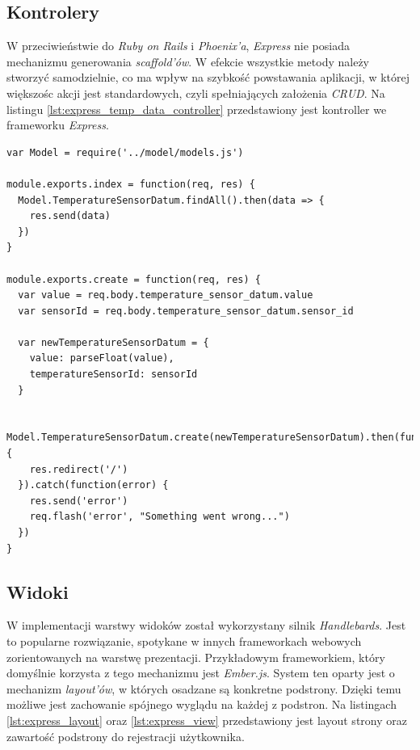 \subsection{Kontrolery}
W przeciwieństwie do \emph{Ruby on Rails} i \emph{Phoenix'a}, \emph{Express} nie posiada mechanizmu generowania \emph{scaffold'ów}. W efekcie wszystkie metody należy stworzyć samodzielnie, co ma wpływ na szybkość powstawania aplikacji, w której większośc akcji jest standardowych, czyli spełniających założenia \emph{CRUD}. Na listingu \ref{lst:express_temp_data_controller} przedstawiony jest kontroller we frameworku \emph{Express}.

\begin{lstlisting}[caption={Kontroler danych z sensora temperatury we frameworku Express.},label={lst:express_temp_data_controller}]
var Model = require('../model/models.js')

module.exports.index = function(req, res) {
  Model.TemperatureSensorDatum.findAll().then(data => {
    res.send(data)
  })
}

module.exports.create = function(req, res) {
  var value = req.body.temperature_sensor_datum.value
  var sensorId = req.body.temperature_sensor_datum.sensor_id

  var newTemperatureSensorDatum = {
    value: parseFloat(value),
    temperatureSensorId: sensorId
  }

  Model.TemperatureSensorDatum.create(newTemperatureSensorDatum).then(function() {
    res.redirect('/')
  }).catch(function(error) {
    res.send('error')
    req.flash('error', "Something went wrong...")
  })
}
\end{lstlisting}

\subsection{Widoki}
W implementacji warstwy widoków został wykorzystany silnik \emph{Handlebards}. Jest to popularne rozwiązanie, spotykane w innych frameworkach webowych zorientowanych na warstwę prezentacji. Przykładowym frameworkiem, który domyślnie korzysta z tego mechanizmu jest \emph{Ember.js}. System ten oparty jest o mechanizm \emph{layout'ów}, w których osadzane są konkretne podstrony. Dzięki temu możliwe jest zachowanie spójnego wyglądu na każdej z podstron. Na listingach \ref{lst:express_layout} oraz \ref{lst:express_view} przedstawiony jest layout strony oraz zawartość podstrony do rejestracji użytkownika.

